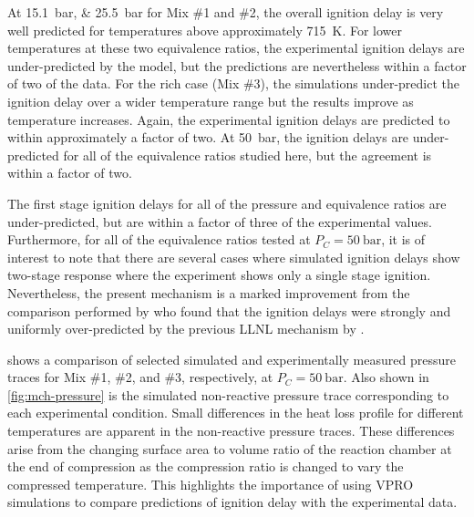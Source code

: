 \documentclass[../main.tex]{subfiles}
\begin{document}
At \SIlist{15.1;25.5}{\bar} for Mix \#1 and \#2, the overall ignition delay is very
well predicted for temperatures above approximately \SI{715}{\kelvin}. For lower
temperatures at these two equivalence ratios, the experimental ignition delays
are under-predicted by the model, but the predictions are nevertheless within
a factor of two of the data. For the rich case (Mix \#3), the simulations
under-predict the ignition delay over a wider temperature range but the results
improve as temperature increases. Again, the experimental ignition delays are
predicted to within approximately a factor of two. At \SI{50}{\bar}, the ignition
delays are under-predicted for all of the equivalence ratios studied here, but
the agreement is within a factor of two.

The first stage ignition delays for all of the pressure and equivalence ratios
are under-predicted, but are within a factor of three of the experimental
values. Furthermore, for all of the equivalence ratios tested at $P_C=\SI{50}{\bar}$,
it is of interest to note that there are several cases where simulated ignition
delays show two-stage response where the experiment shows only a single stage
ignition. Nevertheless, the present mechanism is a marked improvement from the
comparison performed by \textcite{Mittal2009} who found that the ignition
delays were strongly and uniformly over-predicted by the previous LLNL
mechanism by \textcite{Pitz2007}.

 shows a comparison of selected simulated and
experimentally measured pressure traces for Mix \#1, \#2, and \#3,
respectively, at $P_C=\SI{50}{\bar}$. Also shown in \cref{fig:mch-pressure} is the
simulated non-reactive pressure trace corresponding to each experimental
condition. Small differences in the heat loss profile for different
temperatures are apparent in the non-reactive pressure traces. These
differences arise from the changing surface area to volume ratio of the
reaction chamber at the end of compression as the compression ratio is changed
to vary the compressed temperature. This highlights the importance of using
VPRO simulations to compare predictions of ignition delay with the experimental data.
\end{document}
